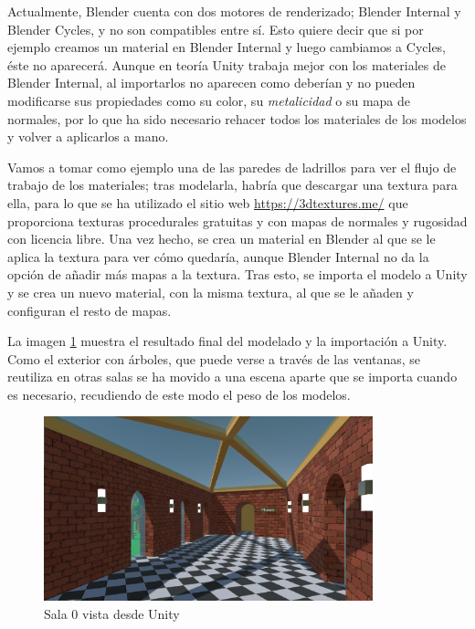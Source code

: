 Actualmente, Blender cuenta con dos motores de renderizado; Blender Internal y Blender Cycles, y no son compatibles entre sí. Esto quiere decir que si por ejemplo creamos un material en Blender Internal y luego cambiamos a Cycles, éste no aparecerá. Aunque en teoría Unity trabaja mejor con los materiales de Blender Internal, al importarlos no aparecen como deberían y no pueden modificarse sus propiedades como su color, su \textit{metalicidad} o su mapa de normales, por lo que ha sido necesario rehacer todos los materiales de los modelos y volver a aplicarlos a mano.

Vamos a tomar como ejemplo una de las paredes de ladrillos para ver el flujo de trabajo de los materiales; tras modelarla, habría que descargar una textura para ella, para lo que se ha utilizado el sitio web \url{https://3dtextures.me/} que proporciona texturas procedurales gratuitas y con mapas de normales y rugosidad con licencia libre. Una vez hecho, se crea un material en Blender al que se le aplica la textura para ver cómo quedaría, aunque Blender Internal no da la opción de añadir más mapas a la textura. Tras esto, se importa el modelo a Unity y se crea un nuevo material, con la misma textura, al que se le añaden y configuran el resto de mapas.

La imagen \ref{fig:unity-sala-0} muestra el resultado final del modelado y la importación a Unity. Como el exterior con árboles, que puede verse a través de las ventanas, se reutiliza en otras salas se ha movido a una escena aparte que se importa cuando es necesario, recudiendo de este modo el peso de los modelos.

\begin{figure}[!h]
\begin{center}
\includegraphics[width=0.85\textwidth]{imagenes/7/salas-unity/unity-sala-0.png}
\caption{Sala 0 vista desde Unity}
\label{fig:unity-sala-0}
\end{center}
\end{figure}


